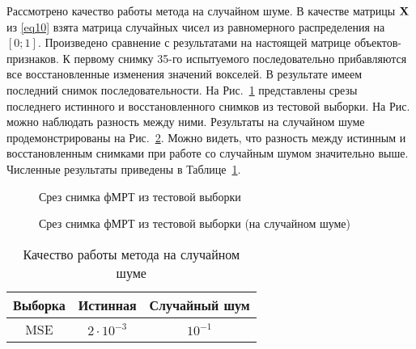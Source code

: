 \documentclass[a4paper, 12pt]{article}
\begin{document}
	Рассмотрено качество работы метода на случайном шуме. В качестве матрицы $\mathbf{X}$ из \eqref{eq10}
	взята матрица случайных чисел из равномерного распределения на $[0; 1]$. 
	Произведено сравнение с результатами на настоящей матрице объектов-признаков. 
	К первому снимку 35-го испытуемого последовательно прибавляются все восстановленные 
	изменения значений вокселей. 
	В результате имеем последний снимок последовательности. На Рис.~\ref*{fig:7}
	представлены срезы последнего истинного и восстановленного снимков из тестовой выборки. 
	На Рис. можно наблюдать разность между ними.
	Результаты на случайном шуме продемонстрированы на Рис.~\ref*{fig:8}.
	Можно видеть, что разность между истинным и восстановленным снимками при работе со случайным шумом
	значительно выше. Численные результаты приведены в Таблице~\ref{table:2}.

	\begin{figure}[h!]
		\centering
		\hfill
		\hfill
		\caption{Срез снимка фМРТ из тестовой выборки}
		\label{fig:7}
	\end{figure}

	\begin{figure}[h!]
		\centering
		\hfill
		\hfill
		\caption{Срез снимка фМРТ из тестовой выборки (на случайном шуме)}
		\label{fig:8}
	\end{figure}

	\begin{table}[h!]
		\centering
		\caption{Качество работы метода на случайном шуме}
		\begin{tabular}{|c|c|c|}
			\hline
			Выборка	&	Истинная	&	Случайный шум \\ \hline \hline
			MSE		& 	$2 \cdot 10^{-3}$	 &		$10^{-1}$ \\ \hline
		\end{tabular}
		\label{table:2}
	\end{table}
\end{document}
